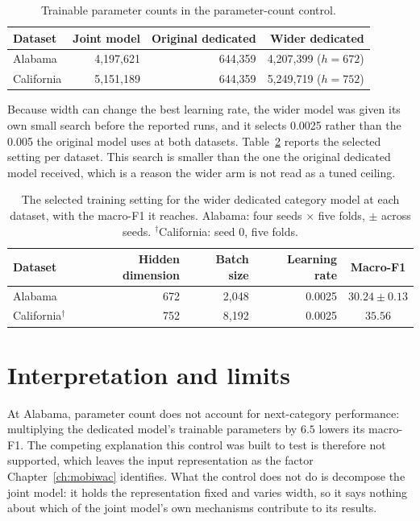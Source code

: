 \begin{table}[H]
    \centering
    \caption{Trainable parameter counts in the parameter-count control.}
    \label{tab:apx-parameter-counts}
    \begin{tabular}{lrrr}
        \toprule
        Dataset & Joint model & Original dedicated & Wider dedicated \\
        \midrule
        Alabama    & 4,197,621 & 644,359 & 4,207,399 ($h=672$) \\
        California & 5,151,189 & 644,359 & 5,249,719 ($h=752$) \\
        \bottomrule
    \end{tabular}
\end{table}

Because width can change the best learning rate, the wider model was given its own small search
before the reported runs, and it selects 0.0025 rather than the 0.005 the original model uses at
both datasets. Table~\ref{tab:apx-parameter-arms} reports the selected setting per dataset. This
search is smaller than the one the original dedicated model received, which is a reason the wider
arm is not read as a tuned ceiling.

\begin{table}[H]
    \centering
    \caption{The selected training setting for the wider dedicated category model at each dataset,
    with the macro-F1 it reaches. Alabama: four seeds $\times$ five folds, $\pm$ across seeds.
    $^{\dagger}$California: seed 0, five folds.}
    \label{tab:apx-parameter-arms}
    \begin{tabular}{lrrrc}
        \toprule
        Dataset & Hidden dimension & Batch size & Learning rate & Macro-F1 \\
        \midrule
        Alabama                 & 672 & 2,048 & 0.0025 & $30.24 \pm 0.13$ \\
        California$^{\dagger}$  & 752 & 8,192 & 0.0025 & $35.56$ \\
        \bottomrule
    \end{tabular}
\end{table}

\section{Interpretation and limits}
\label{sec:apx-parameter-result}

At Alabama, parameter count does not account for next-category performance: multiplying the
dedicated model's trainable parameters by $6.5$ lowers its macro-F1. The competing explanation this
control was built to test is therefore not supported, which leaves the input representation as the
factor Chapter~\ref{ch:mobiwac} identifies. What the control does not do is decompose the joint
model: it holds the representation fixed and varies width, so it says nothing about which of the
joint model's own mechanisms contribute to its results.

